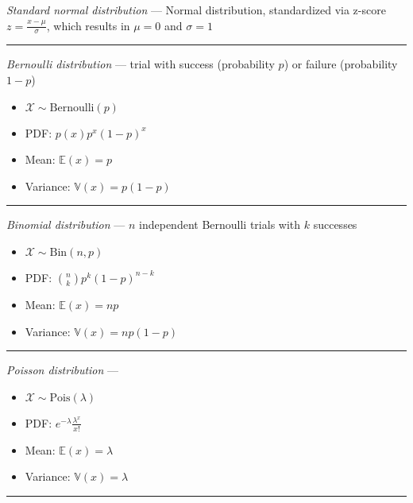 \emph{Standard normal distribution} --- Normal distribution, standardized via z-score $z = \frac{x-\mu}{\sigma}$, which results in $\mu = 0$ and $\sigma = 1$

{\color{lightgray}\hrule height 0.001mm}

\emph{Bernoulli distribution} --- trial with success (probability $p$) or failure (probability $1-p$)
\begin{multicols}{2}
\begin{itemize}
    \item $\mathcal{X} \sim \textrm{Bernoulli}(p)$
    \item PDF: $p(x) p^x (1-p)^x$
    \item Mean: $\mathbb{E}(x) = p$
    \item Variance: $\mathbb{V}(x) = p(1-p)$
\end{itemize}
\end{multicols}

{\color{lightgray}\hrule height 0.001mm}

\emph{Binomial distribution} --- $n$ independent Bernoulli trials with $k$ successes
\begin{multicols}{2}
\begin{itemize}
    \item $\mathcal{X} \sim \textrm{Bin}(n,p)$
    \item PDF: $\binom{n}{k} p^k (1-p)^{n-k}$
    \item Mean: $\mathbb{E}(x) = np$
    \item Variance: $\mathbb{V}(x) = np(1-p)$
\end{itemize}
\end{multicols}

{\color{lightgray}\hrule height 0.001mm}

\emph{Poisson distribution} ---
\begin{multicols}{2}
\begin{itemize}
    \item $\mathcal{X} \sim \textrm{Pois}(\lambda)$
    \item PDF: $e^{-\lambda} \frac{\lambda^x}{x!}$
    \item Mean: $\mathbb{E}(x) = \lambda$
    \item Variance: $\mathbb{V}(x) = \lambda$
\end{itemize}
\end{multicols}

{\color{lightgray}\hrule height 0.001mm}

